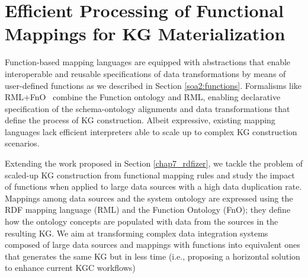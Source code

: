 
\section{Efficient Processing of Functional Mappings for KG Materialization}
\label{chap7_funmap}
Function-based mapping languages \citep{de2017declarative,debruyne2016r2rml,junior2016funul,vu2019d} are equipped with abstractions that enable interoperable and reusable specifications of data transformations by means of user-defined functions as we described in Section \ref{soa2:functions}. Formalisms like RML+FnO~\citep{de2017declarative} combine the Function ontology and RML, enabling declarative specification of the schema-ontology alignments and data transformations that define the process of KG construction. Albeit expressive, existing mapping languages lack efficient interpreters able to scale up to complex KG construction scenarios. 

Extending the work proposed in Section \ref{chap7_rdfizer}, we tackle the problem of scaled-up KG construction from functional mapping rules and study the impact of functions when applied to large data sources with a high data duplication rate. Mappings among data sources and the system ontology are expressed using the RDF mapping language (RML) \citep{de2017declarative} and the Function Ontology (FnO); they define how the ontology concepts are populated with data from the sources in the resulting KG. We aim at transforming complex data integration systems composed of large data sources and mappings with functions into equivalent ones that generates the same KG but in less time (i.e., proposing a horizontal solution to enhance current KGC workflows)

